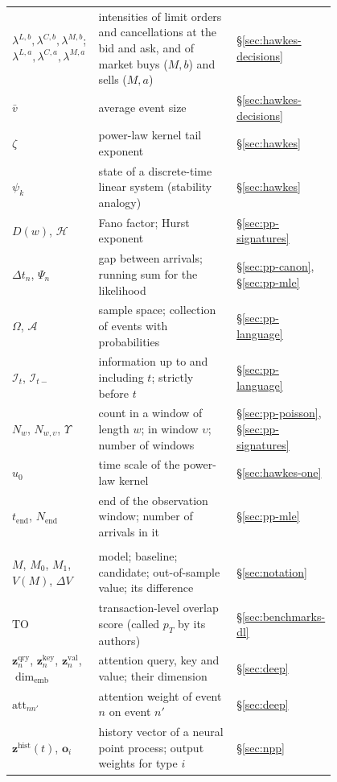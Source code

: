 \begin{center}
\begin{longtable}{>{\raggedright\arraybackslash}p{0.27\linewidth}>{\raggedright\arraybackslash}p{0.53\linewidth}l}
$\lambda^{L,b}, \lambda^{C,b}, \lambda^{M,b}$; $\lambda^{L,a}, \lambda^{C,a}, \lambda^{M,a}$ & intensities of limit orders and cancellations at the bid and ask, and of market buys ($M,b$) and sells ($M,a$) & \S\ref{sec:hawkes-decisions} \\
$\bar v$ & average event size & \S\ref{sec:hawkes-decisions} \\
$\zeta$ & power-law kernel tail exponent & \S\ref{sec:hawkes} \\
$\psi_k$ & state of a discrete-time linear system (stability analogy) & \S\ref{sec:hawkes} \\
$D(w)$, $\mathcal{H}$ & Fano factor; Hurst exponent & \S\ref{sec:pp-signatures} \\
$\Delta t_n$, $\Psi_n$ & gap between arrivals; running sum for the likelihood & \S\ref{sec:pp-canon}, \S\ref{sec:pp-mle} \\
$\Omega$, $\mathcal{A}$ & sample space; collection of events with probabilities & \S\ref{sec:pp-language} \\
$\mathcal{I}_t$, $\mathcal{I}_{t-}$ & information up to and including $t$; strictly before $t$ & \S\ref{sec:pp-language} \\
$N_w$, $N_{w,\upsilon}$, $\Upsilon$ & count in a window of length $w$; in window $\upsilon$; number of windows & \S\ref{sec:pp-poisson}, \S\ref{sec:pp-signatures} \\
$u_0$ & time scale of the power-law kernel & \S\ref{sec:hawkes-one} \\
$t_{\text{end}}$, $N_{\text{end}}$ & end of the observation window; number of arrivals in it & \S\ref{sec:pp-mle} \\
\midrule
\multicolumn{3}{l}{\emph{Models and evaluation}} \\
$M$, $M_0$, $M_1$, $V(M)$, $\Delta V$ & model; baseline; candidate; out-of-sample value; its difference & \S\ref{sec:notation} \\
$\mathrm{TO}$ & transaction-level overlap score (called $p_T$ by its authors) & \S\ref{sec:benchmarks-dl} \\
$\mathbf{z}^{\text{qry}}_n$, $\mathbf{z}^{\text{key}}_n$, $\mathbf{z}^{\text{val}}_n$, $\dim_{\text{emb}}$ & attention query, key and value; their dimension & \S\ref{sec:deep} \\
$\mathrm{att}_{nn'}$ & attention weight of event $n$ on event $n'$ & \S\ref{sec:deep} \\
$\mathbf{z}^{\text{hist}}(t)$, $\mathbf{o}_i$ & history vector of a neural point process; output weights for type $i$ & \S\ref{sec:npp} \\

\end{longtable}
\end{center}
